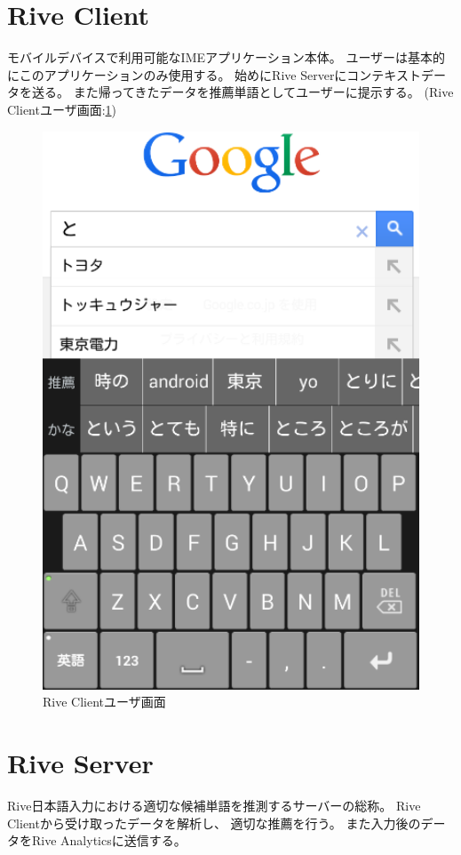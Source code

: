 \section{Rive Client}
モバイルデバイスで利用可能なIMEアプリケーション本体。
ユーザーは基本的にこのアプリケーションのみ使用する。
始めにRive Serverにコンテキストデータを送る。
また帰ってきたデータを推薦単語としてユーザーに提示する。
(Rive Clientユーザ画面:\ref{fig:riveclient})
\begin{figure}
  \begin{center}
    \includegraphics[width=140mm,bb=0 0 390 578]{images/riveclient.png}
  \end{center}
    \caption{Rive Clientユーザ画面}
    \label{fig:riveclient}
\end{figure}

\section{Rive Server}
Rive日本語入力における適切な候補単語を推測するサーバーの総称。
Rive Clientから受け取ったデータを解析し、
適切な推薦を行う。
また入力後のデータをRive Analyticsに送信する。

